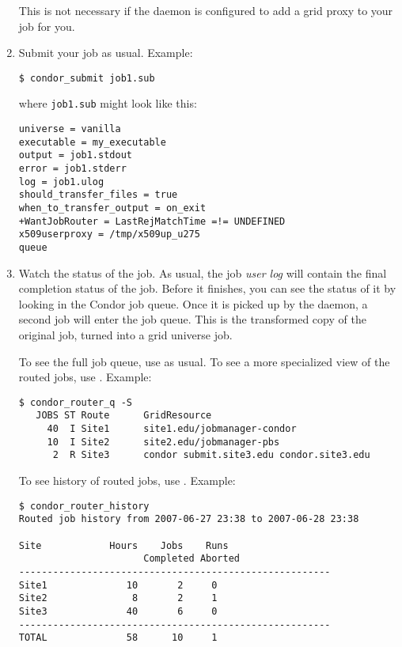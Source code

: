 \begin{enumerate}
This is not necessary if the  daemon is configured to add a grid proxy
to your job for you.

\item Submit your job as usual.  Example:

\begin{verbatim}
$ condor_submit job1.sub
\end{verbatim}

where \verb|job1.sub| might look like this:

\begin{verbatim}
universe = vanilla
executable = my_executable
output = job1.stdout
error = job1.stderr
log = job1.ulog
should_transfer_files = true
when_to_transfer_output = on_exit
+WantJobRouter = LastRejMatchTime =!= UNDEFINED
x509userproxy = /tmp/x509up_u275
queue
\end{verbatim}

\item Watch the status of the job.  As usual, the job \textit{user log} will
contain the final completion status of the job.  Before it finishes,
you can see the status of it by looking in the Condor job queue.  Once
it is picked up by the  daemon, a second job will enter the job queue.
This is the transformed copy of the original job, turned into a grid
universe job.

To see the full job queue, use  as usual.  To
see a more specialized view of the routed jobs, use
.  Example:

\begin{verbatim}
$ condor_router_q -S
   JOBS ST Route      GridResource
     40  I Site1      site1.edu/jobmanager-condor
     10  I Site2      site2.edu/jobmanager-pbs
      2  R Site3      condor submit.site3.edu condor.site3.edu
\end{verbatim}

To see history of routed jobs, use .  Example:

\begin{verbatim}
$ condor_router_history
Routed job history from 2007-06-27 23:38 to 2007-06-28 23:38

Site            Hours    Jobs    Runs
                      Completed Aborted
-------------------------------------------------------
Site1              10       2     0
Site2               8       2     1
Site3              40       6     0
-------------------------------------------------------
TOTAL              58      10     1
\end{verbatim}

\end{enumerate}



